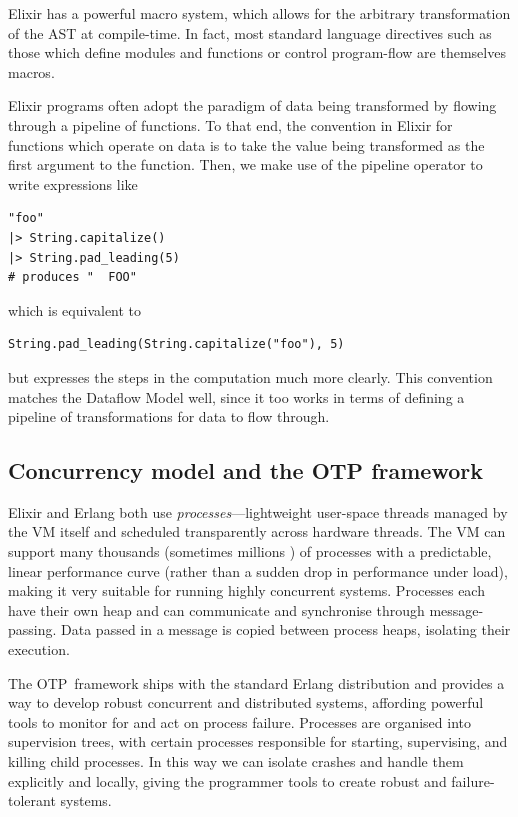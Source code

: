 Elixir has a powerful macro system, which allows for the arbitrary transformation of the AST at compile-time.
In fact, most standard language directives such as those which define modules and functions or control program-flow are themselves macros.

Elixir programs often adopt the paradigm of data being transformed by flowing through a pipeline of functions.
To that end, the convention in Elixir for functions which operate on data is to take the value being transformed as the first argument to the function.
Then, we make use of the pipeline operator \exs{|>} to write expressions like
\begin{verbatim}
"foo"
|> String.capitalize()
|> String.pad_leading(5)
# produces "  FOO"
\end{verbatim}
which is equivalent to
\begin{verbatim}
String.pad_leading(String.capitalize("foo"), 5)		
\end{verbatim}
but expresses the steps in the computation much more clearly.
This convention matches the Dataflow Model well, since it too works in terms of defining a pipeline of transformations for data to flow through.

\subsection{Concurrency model and the OTP framework}\label{sec:prep:elixir:otp}

Elixir and Erlang both use \emph{processes}---lightweight user-space threads managed by the VM itself and scheduled transparently across hardware threads.
The VM can support many thousands (sometimes millions \cite{elixir-2million-processes}) of processes with a predictable, linear performance curve (rather than a sudden drop in performance under load), making it very suitable for running highly concurrent systems.
Processes each have their own heap and can communicate and synchronise through message-passing.
Data passed in a message is copied between process heaps, isolating their execution.

The OTP\footnotemark\ framework ships with the standard Erlang distribution and provides a way to develop robust concurrent and distributed systems, affording powerful tools to monitor for and act on process failure.
Processes are organised into supervision trees, with certain processes responsible for starting, supervising, and killing child processes.
In this way we can isolate crashes and handle them explicitly and locally, giving the programmer tools to create robust and failure-tolerant systems.

